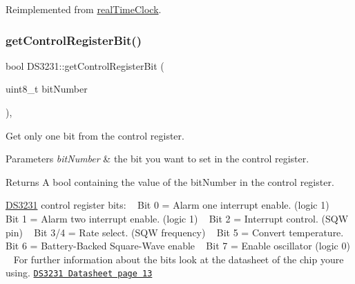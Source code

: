 Reimplemented from \mbox{\hyperlink{classreal_time_clock_a13820319507d89a62a5b37b252ea6d0d}{real\+Time\+Clock}}.

\mbox{\label{class_d_s3231_a5b22edafc0d475fd6e33936c286654d5}} 
\subsubsection{\texorpdfstring{get\+Control\+Register\+Bit()}{getControlRegisterBit()}}
{\footnotesize\ttfamily bool D\+S3231\+::get\+Control\+Register\+Bit (\begin{DoxyParamCaption}\item[{uint8\+\_\+t}]{bit\+Number }\end{DoxyParamCaption})\hspace{0.3cm}{\ttfamily [override]}, {\ttfamily [virtual]}}



Get only one bit from the control register. 


\begin{DoxyParams}{Parameters}
{\em bit\+Number} & the bit you want to set in the control register. \\
\hline
\end{DoxyParams}
\begin{DoxyReturn}{Returns}
A bool containing the value of the bit\+Number in the control register.
\end{DoxyReturn}
\mbox{\hyperlink{class_d_s3231}{D\+S3231}} control register bits\+: ~\newline
 Bit 0 = Alarm one interrupt enable. (logic 1) ~\newline
 Bit 1 = Alarm two interrupt enable. (logic 1) ~\newline
 Bit 2 = Interrupt control. (S\+QW pin) ~\newline
 Bit 3/4 = Rate select. (S\+QW frequency) ~\newline
 Bit 5 = Convert temperature. ~\newline
 Bit 6 = Battery-\/\+Backed Square-\/\+Wave enable ~\newline
 Bit 7 = Enable oscillator (logic 0) ~\newline
 For further information about the bits look at the datasheet of the chip you\textquotesingle{}re using. \href{https://datasheets.maximintegrated.com/en/ds/DS3231.pdf}{\tt D\+S3231 Datasheet page 13} 

